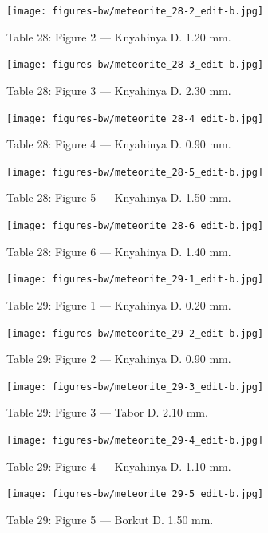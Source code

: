 \documentclass[a4paper, 12pt, oneside]{article}
\begin{document}
\clearpage
\begin{figure}[t]
\texttt{[image: figures-bw/meteorite\_28-2\_edit-b.jpg]}
\caption{Table 28: Figure 2 --- Knyahinya D. 1.20 mm.}
\centering
\end{figure}
\clearpage
\begin{figure}[t]
\texttt{[image: figures-bw/meteorite\_28-3\_edit-b.jpg]}
\caption{Table 28: Figure 3 --- Knyahinya D. 2.30 mm.}
\centering
\end{figure}
\clearpage
\begin{figure}[t]
\texttt{[image: figures-bw/meteorite\_28-4\_edit-b.jpg]}
\caption{Table 28: Figure 4 --- Knyahinya D. 0.90 mm.}
\centering
\end{figure}
\clearpage
\begin{figure}[t]
\texttt{[image: figures-bw/meteorite\_28-5\_edit-b.jpg]}
\caption{Table 28: Figure 5 --- Knyahinya D. 1.50 mm.}
\centering
\end{figure}
\clearpage
\begin{figure}[t]
\texttt{[image: figures-bw/meteorite\_28-6\_edit-b.jpg]}
\caption{Table 28: Figure 6 --- Knyahinya D. 1.40 mm.}
\centering
\end{figure}
\clearpage
{}
\begin{figure}[t]
\texttt{[image: figures-bw/meteorite\_29-1\_edit-b.jpg]}
\caption{Table 29: Figure 1 --- Knyahinya D. 0.20 mm.}
\centering
\end{figure}
\clearpage
\begin{figure}[t]
\texttt{[image: figures-bw/meteorite\_29-2\_edit-b.jpg]}
\caption{Table 29: Figure 2 --- Knyahinya D. 0.90 mm.}
\centering
\end{figure}
\clearpage
\begin{figure}[t]
\texttt{[image: figures-bw/meteorite\_29-3\_edit-b.jpg]}
\caption{Table 29: Figure 3 --- Tabor D. 2.10 mm.}
\centering
\end{figure}
\clearpage
\begin{figure}[t]
\texttt{[image: figures-bw/meteorite\_29-4\_edit-b.jpg]}
\caption{Table 29: Figure 4 --- Knyahinya D. 1.10 mm.}
\centering
\end{figure}
\clearpage
\begin{figure}[t]
\texttt{[image: figures-bw/meteorite\_29-5\_edit-b.jpg]}
\caption{Table 29: Figure 5 --- Borkut D. 1.50 mm.}
\centering
\end{figure}
\end{document}
